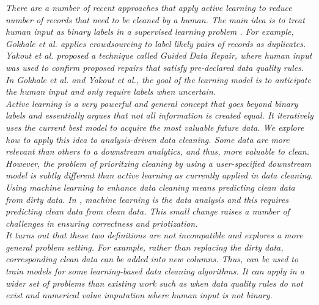 \emph{There are a number of recent approaches that apply active learning to reduce number of records that need to be cleaned by a human.
The main idea is to treat human input as binary labels in a supervised learning problem \cite{DBLP:journals/pvldb/MozafariSFJM14}.
For example, Gokhale et al. \cite{gokhale2014corleone} applies crowdsourcing to label likely pairs of records as duplicates.
Yakout et al. \cite{DBLP:journals/pvldb/YakoutENOI11} proposed a technique called Guided Data Repair, where human input was used to confirm proposed repairs that satisfy pre-declared data quality rules.
In Gokhale et al. and Yakout et al., the goal of the learning model is to anticipate the human input and only require labels when uncertain.\\
Active learning is a very powerful and general concept that goes beyond binary labels and essentially argues that not all information is created equal.
It iteratively uses the current best model to acquire the most valuable future data.
We explore how to apply this idea to analysis-driven data cleaning. 
Some data are more relevant than others to a downstream analytics, and thus, more valuable to clean.
However, the problem of prioritzing cleaning by using a user-specified downstream model is subtly different than active learning as currently applied in data cleaning.
Using machine learning to enhance data cleaning means predicting clean data from dirty data.
In \sys, machine learning is the data analysis and this requires predicting clean data from \emph{clean data}.
This small change raises a number of challenges in ensuring correctness and priotization.\\
It turns out that these two definitions are not incompatible and \sys explores a more general problem setting.
For example, rather than replacing the dirty data, corresponding clean data can be added into new columns. 
Thus, \sys can be used to train models for some learning-based data cleaning algorithms.
It can apply in a wider set of problems than existing work such as when data quality rules do not exist and numerical value imputation where human input is not binary.}

